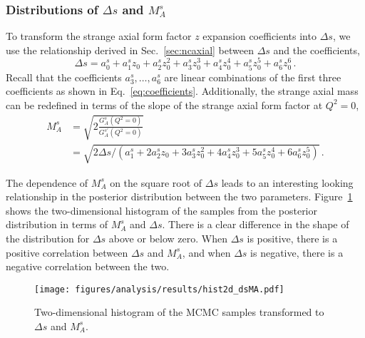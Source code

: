   \subsubsection{Distributions of $\Delta s$ and $M_A^s$}
    To transform the strange axial form factor $z$ expansion coefficients into
    $\Delta s$, we use the relationship derived in Sec.~\ref{sec:ncaxial}
    between $\Delta s$ and the coefficients,
    \begin{equation}
      \Delta s = a_0^s + a_1^s z_0 + a_2^s z_0^2 
        + a_3^s z_0^3 + a_4^s z_0^4 + a_5^s z_0^5 + a_6^s z_0^6 \,.
    \end{equation}
    Recall that the coefficients $a_3^s,\ldots,a_6^s$ are linear combinations
    of the first three coefficients as shown in Eq.~\ref{eq:coefficients}.
    Additionally, the strange axial mass can be redefined in terms of the slope
    of the strange axial form factor at $Q^2=0$, \begin{equation}
    \begin{aligned} M_A^s &= \sqrt{2\frac{G_A^s(Q^2=0)}{G_A^{s\prime}(Q^2=0)}}
    \\ &= \sqrt{2 \Delta s/(a_1^s + 2a_2^s z_0 + 3a_3^s z_0^2 + 4a_4^s z_0^3 +
    5a_5^s z_0^4 + 6a_6^s z_0^5)} \,.  \end{aligned} \end{equation}

    The dependence of $M_A^s$ on the square root of $\Delta s$ leads to an
    interesting looking relationship in the posterior distribution between the
    two parameters. Figure~\ref{fig:hist2dmads} shows the two-dimensional
    histogram of the samples from the posterior distribution in terms of
    $M_A^s$ and $\Delta s$. There is a clear difference in the shape of the
    distribution for $\Delta s$ above or below zero. When $\Delta s$ is
    positive, there is a positive correlation between $\Delta s$ and $M_A^s$,
    and when $\Delta s$ is negative, there is a negative correlation between
    the two.  \begin{figure}[h] \centering
    \texttt{[image: figures/analysis/results/hist2d\_dsMA.pdf]}
    \caption{Two-dimensional histogram of the MCMC samples transformed to
    $\Delta s$ and $M_A^s$.} \label{fig:hist2dmads} \end{figure}

